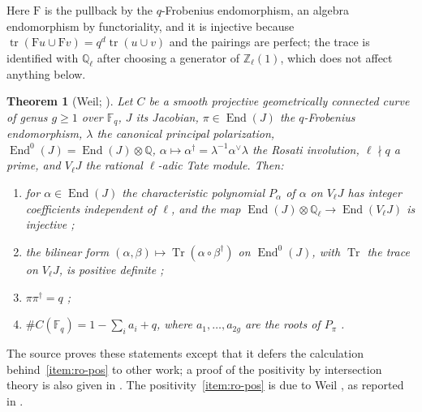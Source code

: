 \documentclass[11pt]{amsart}
\theoremstyle{plain}
\newtheorem{theorem}{Theorem}[section]
\theoremstyle{definition}
\theoremstyle{remark}
\numberwithin{equation}{section}
\newcommand{\Q}{\mathbb{Q}}
\newcommand{\Z}{\mathbb{Z}}
\newcommand{\F}{\mathbb{F}}
\DeclareMathOperator{\Tr}{Tr}
\begin{document}
Here $\mathrm{F}$ is the pullback by the $q$-Frobenius endomorphism, an
algebra endomorphism by functoriality, and it is injective because
$\operatorname{tr}(\mathrm{F}u\cup\mathrm{F}v)=q^d\operatorname{tr}
(u\cup v)$ and the pairings are perfect; the trace is identified with
$\Q_\ell$ after choosing a generator of $\Z_\ell(1)$, which does not
affect anything below.


\begin{theorem}[Weil; {\cite{MilneAV2008}}]\label{thm:imp-rosati}
Let $C$ be a smooth projective geometrically connected curve of genus
$g\ge1$ over $\F_q$, $J$ its Jacobian, $\pi\in\operatorname{End}(J)$ the
$q$-Frobenius endomorphism, $\lambda$ the canonical principal
polarization, $\operatorname{End}^0(J)=\operatorname{End}(J)\otimes\Q$,
$\alpha\mapsto\alpha^\dagger=\lambda^{-1}\alpha^\vee\lambda$ the Rosati
involution, $\ell\nmid q$ a prime, and $V_\ell J$ the rational
$\ell$-adic Tate module. Then:
\begin{enumerate}[label=(\roman*)]
\item\label{item:ro-char} for $\alpha\in\operatorname{End}(J)$ the
  characteristic polynomial $P_\alpha$ of $\alpha$ on $V_\ell J$ has
  integer coefficients independent of $\ell$, and the map
  $\operatorname{End}(J)\otimes\Q_\ell\to\operatorname{End}(V_\ell J)$
  is injective \cite[Theorem~10.9, p.~46, Theorem~10.15, p.~49, and
  Proposition~10.20, p.~50]{MilneAV2008};
\item\label{item:ro-pos} the bilinear form $(\alpha,\beta)\mapsto
  \Tr(\alpha\circ\beta^\dagger)$ on $\operatorname{End}^0(J)$, with
  $\Tr$ the trace on $V_\ell J$, is positive definite
  \cite[Theorem~14.3, p.~62]{MilneAV2008};
\item\label{item:ro-pi} $\pi\pi^\dagger=q$
  \cite[Chapter~II, Lemma~1.2, p.~76]{MilneAV2008};
\item\label{item:ro-count} $\#C(\F_q)=1-\sum_ia_i+q$, where $a_1,\dots,
  a_{2g}$ are the roots of $P_\pi$
  \cite[Chapter~III, Theorem~11.1, p.~118]{MilneAV2008}.
\end{enumerate}
\end{theorem}

The source proves these statements except that it defers the
calculation behind~\ref{item:ro-pos} to other work; a proof of the
positivity by intersection theory is also given in
\cite[Theorem~1.27, p.~21]{Milne2016RHFF}.
The positivity~\ref{item:ro-pos} is due to Weil
\cite{Weil1948VarietesAbeliennes}, as reported in
\cite[p.~23]{Milne2016RHFF}.
\end{document}
